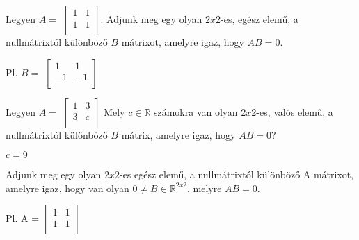 \begin{frame}
  \begin{tcolorbox}[title={6/2. {\symknight}}]
    Legyen $A =$ $\begin{bmatrix} 
  				1 & 1 \\
  				1 & 1 \\
			\end{bmatrix}$. Adjunk meg egy olyan $2 x 2$-es, egész elemű, a nullmátrixtól különböző $B$ mátrixot, amelyre igaz, hogy $AB = 0$.

  \tcblower

    \mmedskip 
    
    Pl. $B =$ $\begin{bmatrix} 
  				1 & 1 \\
  				-1 & -1 \\
			\end{bmatrix}$
  \end{tcolorbox}
\end{frame}


\begin{frame}
  \begin{tcolorbox}[title={6/3. {\symknight}}]
     Legyen $A =$ $\begin{bmatrix} 
  				1 & 3 \\
  				3 & c \\
			\end{bmatrix}$ Mely $c \in \mathbb{R}$ számokra van olyan $2 x 2$-es, valós elemű, a nullmátrixtól különböző $B$ mátrix, amelyre igaz, hogy $AB = 0$?
  \tcblower

    \mmedskip 
    
    $c = 9$
  \end{tcolorbox}
\end{frame}


\begin{frame}
  \begin{tcolorbox}[title={6/4. {\symknight}}]
     Adjunk meg egy olyan $2 x 2$-es egész elemű, a nullmátrixtól különböző A mátrixot, amelyre igaz, hogy van olyan $0 \neq B \in \mathbb{R}^{2 x 2}$, melyre $AB = 0$.
  \tcblower

    \mmedskip 
    
    Pl. A = $\begin{bmatrix} 
  				1 & 1 \\
  				1 & 1 \\
			\end{bmatrix}$
  \end{tcolorbox}
\end{frame}


